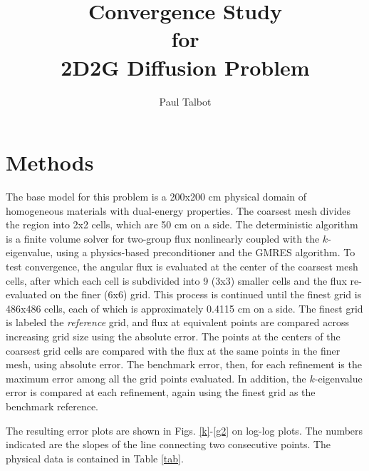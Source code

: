 \documentclass[11pt]{article} %
\title{Convergence Study\\for\\2D2G Diffusion Problem}
\author{Paul Talbot}
\begin{document}
\maketitle

\section*{Methods}
The base model for this problem is a 200x200 cm physical domain of homogeneous materials with dual-energy properties.  The coarsest mesh divides the region into 2x2 cells, which are 50 cm on a side.  The deterministic algorithm is a finite volume solver for two-group flux nonlinearly coupled with the $k$-eigenvalue, using a physics-based preconditioner and the GMRES algorithm.  To test convergence, the angular flux is evaluated at the center of the coarsest mesh cells, after which each cell is subdivided into 9 (3x3) smaller cells and the flux re-evaluated on the finer (6x6) grid.  This process is continued until the finest grid is 486x486 cells, each of which is approximately 0.4115 cm on a side.  The finest grid is labeled the \emph{reference} grid, and flux at equivalent points are compared across increasing grid size using the absolute error.  The points at the centers of the coarsest grid cells are compared with the flux at the same points in the finer mesh, using absolute error.  The benchmark error, then, for each refinement is the maximum error among all the grid points evaluated.  In addition, the $k$-eigenvalue error is compared at each refinement, again using the finest grid as the benchmark reference.

The resulting error plots are shown in Figs. \ref{k}-\ref{g2} on log-log plots.  The numbers indicated are the slopes of the line connecting two consecutive points.  The physical data is contained in Table \ref{tab}.
\end{document}
